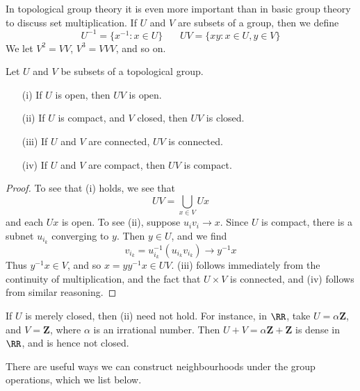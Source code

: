 In topological group theory it is even more important than in basic group theory to discuss set multiplication. If $U$ and $V$ are subsets of a group, then we define
%
\[ U^{-1} = \{ x^{-1} : x \in U \}\ \ \ \ \ \ \ \ UV = \{ xy: x \in U, y \in V \} \]
%
We let $V^2 = VV$, $V^3 = VVV$, and so on.

\begin{theorem}
    Let $U$ and $V$ be subsets of a topological group.
    \begin{enumerate}
        \item[(i)] If $U$ is open, then $UV$ is open.
        \item[(ii)] If $U$ is compact, and $V$ closed, then $UV$ is closed.
        \item[(iii)] If $U$ and $V$ are connected, $UV$ is connected.
        \item[(iv)] If $U$ and $V$ are compact, then $UV$ is compact.
    \end{enumerate}
\end{theorem}
\begin{proof}
    To see that (i) holds, we see that
    \[ UV = \bigcup_{x \in V} Ux \]
    and each $Ux$ is open. To see (ii), suppose $u_i v_i \to x$. Since $U$ is compact, there is a subnet $u_{i_k}$ converging to $y$. Then $y \in U$, and we find
    \[ v_{i_k} = u_{i_k}^{-1} ( u_{i_k} v_{i_k} ) \to y^{-1} x \]
    Thus $y^{-1} x \in V$, and so $x = y y^{-1} x \in UV$. (iii) follows immediately from the continuity of multiplication, and the fact that $U \times V$ is connected, and (iv) follows from similar reasoning.
\end{proof}

\begin{example}
    If $U$ is merely closed, then (ii) need not hold. For instance, in $\RR$, take $U = \alpha \mathbf{Z}$, and $V = \mathbf{Z}$, where $\alpha$ is an irrational number. Then $U + V = \alpha \mathbf{Z} + \mathbf{Z}$ is dense in $\RR$, and is hence not closed.
\end{example}

There are useful ways we can construct neighbourhoods under the group operations, which we list below.

